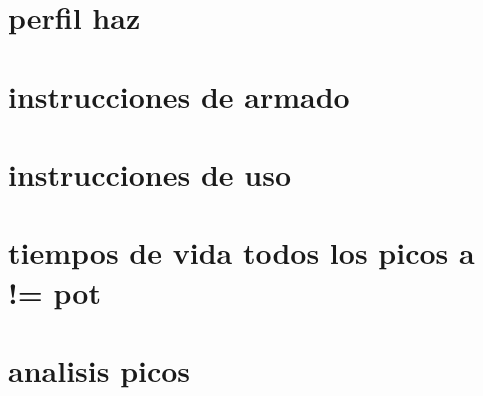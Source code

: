 
\renewcommand{\thesection}{\Alph{section}}

\section{perfil haz}
\section{instrucciones de armado}
\section{instrucciones de uso}
\section{tiempos de vida todos los picos a != pot}
\section{analisis picos}